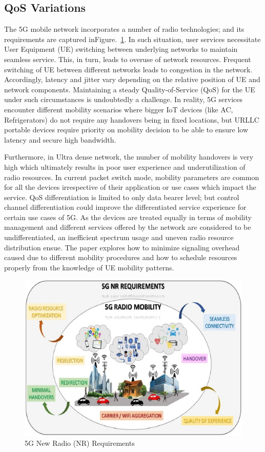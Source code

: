 \begin{multicols}{2}
\subsection{QoS Variations}

The 5G mobile network incorporates a number of radio technologies; and its requirements are captured in\break Figure.~\ref{chap1-fig02}. In such situation, user services necessitate User Equipment (UE) switching between underlying networks to maintain seamless service. This, in turn, leads to overuse of network resources. Frequent switching of UE between different networks leads to congestion in the network. Accordingly, latency and jitter vary depending on the relative position of UE and network components. Maintaining a steady Quality-of-Service (QoS) for the UE under such circumstances is undoubtedly a challenge. In reality, 5G services encounter different mobility scenarios where bigger IoT devices (like AC, Refrigerators) do not require any handovers being in fixed locations, but URLLC portable devices require priority on mobility decision to be able to ensure low latency and secure high bandwidth.

Furthermore, in Ultra dense network, the number of mobility handovers is very high which ultimately results in poor user experience and underutilization of radio resources. In current packet switch mode, mobility parameters are common for all the devices irrespective of their application or use cases which impact the service. QoS differentiation is limited to only data bearer level; but control channel differentiation could improve the differentiated service experience for certain use cases of 5G. As the devices are treated equally in terms of mobility management and different services offered by the network are considered to be undifferentiated, an inefficient spectrum usage and uneven radio resource distribution ensue. The paper \cite{art1-key01} explores how to minimize signaling overhead caused due to different mobility procedures and how to schedule resources properly from the knowledge of UE mobility patterns.

\begin{figure}[H]
\centering
\includegraphics[scale=1.8]{src/Figures/chap1/chap1-fig02.jpg}
\caption{5G New Radio (NR) Requirements }\label{chap1-fig02}
\end{figure}



\end{multicols}
